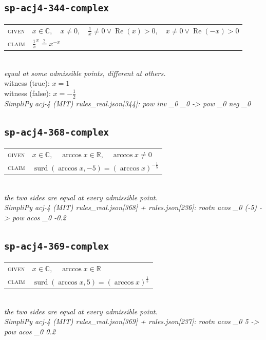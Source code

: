 \documentclass[11pt]{article}
\begin{document}
\subsection*{\texttt{sp-acj4-344-complex}}
\begin{tabular}{@{}l@{\quad}l@{}}
\textsc{given} & $x \in \mathbb{C},\quad x \neq 0,\quad \frac{1}{x} \neq 0 \lor \operatorname{Re}\left(x\right) > 0,\quad x \neq 0 \lor \operatorname{Re}\left(-x\right) > 0$ \\[4pt]
\textsc{claim} & $\displaystyle \frac{1}{x}^{x} \overset{?}{=} x^{-x}$ \\
\end{tabular}\\[2pt]
{\small\emph{equal at some admissible points, different at others.}}\\
{\footnotesize\color{gray}witness (true): $x = 1$}\\
{\footnotesize\color{gray}witness (false): $x = -\frac{1}{2}$}\\
\emph{SimpliPy acj-4 (MIT) rules\_real.json[344]: pow inv \_0 \_0  ->  pow \_0 neg \_0}\\

\subsection*{\texttt{sp-acj4-368-complex}}
\begin{tabular}{@{}l@{\quad}l@{}}
\textsc{given} & $x \in \mathbb{C},\quad \arccos x \in \mathbb{R},\quad \arccos x \neq 0$ \\[4pt]
\textsc{claim} & $\displaystyle \operatorname{surd}\left(\arccos x, -5\right) = \left(\arccos x\right)^{-\frac{1}{5}}$ \\
\end{tabular}\\[2pt]
{\small\emph{the two sides are equal at every admissible point.}}\\
\emph{SimpliPy acj-4 (MIT) rules\_real.json[368] + rules.json[236]: rootn acos \_0 (-5)  ->  pow acos \_0 -0.2}\\

\subsection*{\texttt{sp-acj4-369-complex}}
\begin{tabular}{@{}l@{\quad}l@{}}
\textsc{given} & $x \in \mathbb{C},\quad \arccos x \in \mathbb{R}$ \\[4pt]
\textsc{claim} & $\displaystyle \operatorname{surd}\left(\arccos x, 5\right) = \left(\arccos x\right)^{\frac{1}{5}}$ \\
\end{tabular}\\[2pt]
{\small\emph{the two sides are equal at every admissible point.}}\\
\emph{SimpliPy acj-4 (MIT) rules\_real.json[369] + rules.json[237]: rootn acos \_0 5  ->  pow acos \_0 0.2}\\
\end{document}

